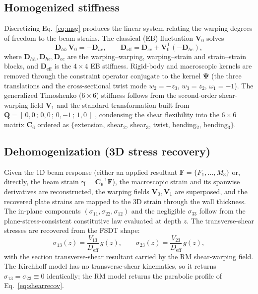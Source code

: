 \documentclass[preprint,12pt]{elsarticle}
\newcommand{\T}{^{\mathsf{T}}}
\newcommand{\bC}{\mathbf{C}}
\newcommand{\bD}{\mathbf{D}}
\newcommand{\bV}{\mathbf{V}}
\newcommand{\bgamma}{\bm{\gamma}}
\begin{document}
\subsection{Homogenized stiffness}
Discretizing Eq.~\eqref{eq:msg} produces the linear system relating the
warping degrees of freedom to the beam strains. The classical (EB) fluctuation
$\bV_0$ solves
\begin{equation}
\mathbf{D}_{hh}\,\bV_0=-\mathbf{D}_{he},\qquad
\bD_{\mathrm{eff}}=\mathbf{D}_{ee}+\bV_0\T(-\mathbf{D}_{he}),
\end{equation}
where $\mathbf{D}_{hh},\mathbf{D}_{he},\mathbf{D}_{ee}$ are the warping--warping,
warping--strain and strain--strain blocks, and $\bD_{\mathrm{eff}}$ is the
$4\times4$ EB stiffness. Rigid-body and macroscopic kernels are removed through
the constraint operator conjugate to the kernel
$\bm{\Psi}$ (the three translations and the cross-sectional twist mode
$w_2=-z_3,\,w_3=z_2,\,\omega_1=-1$). The generalized Timoshenko ($6\times6$)
stiffness follows from the second-order shear-warping field $\bV_1$ and the
standard transformation built from
$\mathbf{Q}=[\,0,0\,;\,0,0\,;\,0,-1\,;\,1,0\,]$ \cite{yu2002}, condensing the
shear flexibility into the $6\times6$ matrix $\bC_{6}$ ordered as
$\{$extension, shear$_2$, shear$_3$, twist, bending$_2$, bending$_3\}$.

\subsection{Dehomogenization (3D stress recovery)}
\label{sec:dehom}
Given the 1D beam response (either an applied resultant
$\bm{F}=\{F_1,\dots,M_3\}$ or, directly, the beam strain
$\bgamma=\bC_6^{-1}\bm{F}$), the macroscopic strain and its spanwise
derivatives are reconstructed, the warping fields $\bV_0,\bV_1$ are
superposed, and the recovered plate strains are mapped to the 3D strain through
the wall thickness. The in-plane components $(\sigma_{11},\sigma_{22},
\sigma_{12})$ and the negligible $\sigma_{33}$ follow from the
plane-stress-consistent constitutive law evaluated at depth $z$. The
transverse-shear stresses are recovered from the FSDT shape:
\begin{equation}
\sigma_{13}(z)=\frac{V_{13}}{D_{\text{eff}}}\,g(z),\qquad
\sigma_{23}(z)=\frac{V_{23}}{D_{\text{eff}}}\,g(z),
\label{eq:shearrecov}
\end{equation}
with the section transverse-shear resultant carried by the RM shear-warping
field. The Kirchhoff model has no transverse-shear kinematics, so it returns
$\sigma_{13}=\sigma_{23}\equiv0$ identically; the RM model returns the parabolic
profile of Eq.~\eqref{eq:shearrecov}.
\end{document}
